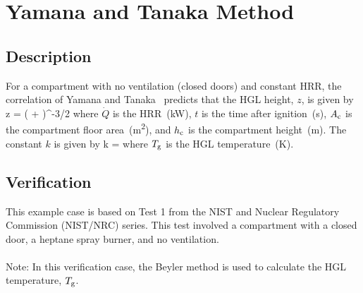 \clearpage


\section{Yamana and Tanaka Method}

\subsection*{Description}

For a compartment with no ventilation (closed doors) and constant HRR, the correlation of Yamana and Tanaka~\cite{Tanaka:1} predicts that the HGL height, $z$, is given by
\be
z = \left(  +  \right)^{-3/2}
\label{eq:Yamana_Tanaka}
\ee
where $\dot Q$ is the HRR~(\si{kW}), $t$ is the time after ignition~(\si{s}), $A\sb{c}$ is the compartment floor area~(\si{m^2}), and $h\sb{c}$ is the compartment height~(\si{m}). The constant $k$ is given by
\be
k = 
\ee
where $T\sb{g}$ is the HGL temperature~(\si{K}).


\clearpage


\subsection*{Verification}

This example case is based on Test 1 from the NIST and Nuclear Regulatory Commission (NIST/NRC) series. This test involved a compartment with a closed door, a heptane spray burner, and no ventilation.
\\ \\
\noindent Note: In this verification case, the Beyler method is used to calculate the HGL temperature, $T\sb{g}$.


